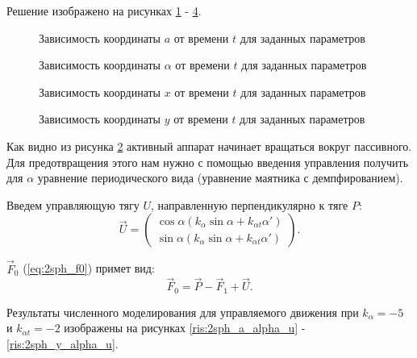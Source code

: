 Решение изображено на рисунках \ref{ris:2sph_a_no_u} - \ref{ris:2sph_y_no_u}.

\begin{figure}[H]
	\caption{Зависимость координаты $a$ от времени $t$ для заданных параметров}
	\label{ris:2sph_a_no_u}
\end{figure}
\begin{figure}[H]
	\caption{Зависимость координаты $\alpha$ от времени $t$ для заданных параметров}
	\label{ris:2sph_alpha_no_u}
\end{figure} 
\begin{figure}[H]
	\caption{Зависимость координаты $x$ от времени $t$ для заданных параметров}
	\label{ris:2sph_x_no_u}
\end{figure} 
\begin{figure}[H]
	\caption{Зависимость координаты $y$ от времени $t$ для заданных параметров}
	\label{ris:2sph_y_no_u}
\end{figure} 

Как видно из рисунка \ref{ris:2sph_alpha_no_u} активный аппарат начинает вращаться вокруг пассивного.
Для предотвращения этого нам нужно с помощью введения управления получить для $\alpha$ уравнение периодического вида (уравнение маятника с демпфированием).

Введем управляющую тягу $U$, направленную перпендикулярно к тяге $P$:
\begin{equation}
\label{ris:2sph_U_alpha}
	\vec{U} = 
	\begin{pmatrix}
		\cos \alpha \left(k_\alpha \sin \alpha + k_{\alpha t}\alpha'\right)\\
		\sin \alpha \left(k_\alpha \sin \alpha + k_{\alpha t}\alpha'\right)
	\end{pmatrix}.
\end{equation}

$\vec{F}_0$ (\ref{eq:2sph_f0}) примет вид:
\begin{equation}
\label{eq:2sph_f0_u}
	\vec{F}_0 = \vec{P} - \vec{F}_1 + \vec{U}.
\end{equation}

Результаты численного моделирования для управляемого движения при $k_\alpha = -5$ и $k_{\alpha t} = -2$ изображены на рисунках \ref{ris:2sph_a_alpha_u} - \ref{ris:2sph_y_alpha_u}.

